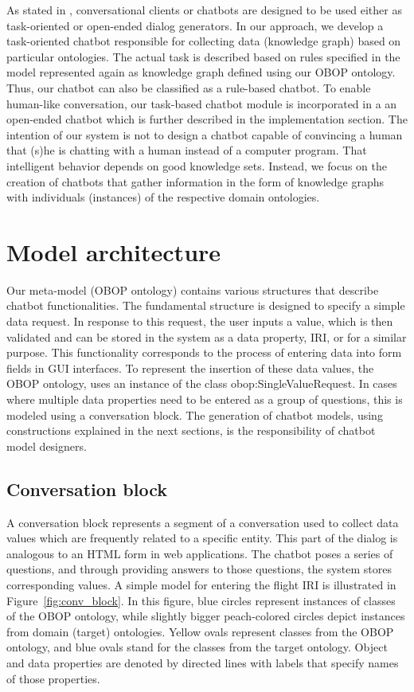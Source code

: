 \documentclass[runningheads]{llncs}
\begin{document}
As stated in \cite{agarwal2020review}, conversational clients or chatbots are designed to be used either as task-oriented or open-ended dialog generators. In our approach, we develop a task-oriented chatbot responsible for collecting data (knowledge graph) based on particular ontologies. The actual task is described based on rules specified in the model represented again as knowledge graph defined using our OBOP ontology. Thus, our chatbot can also be classified as a rule-based chatbot. To enable human-like conversation, our task-based chatbot module is incorporated in a an open-ended chatbot which is further described in the implementation section. The intention of our system is not to design a chatbot capable of convincing a human that (s)he is chatting with a human instead of a computer program. That intelligent behavior depends on good knowledge sets. Instead, we focus on the creation of chatbots that gather information in the form of knowledge graphs with individuals (instances) of the respective domain ontologies.  



\section{Model architecture}
Our meta-model (OBOP ontology) contains various structures that describe chatbot functionalities. The fundamental structure is designed to specify a simple data request. In response to this request, the user inputs a value, which is then validated and can be stored in the system as a data property, IRI, or for a similar purpose. This functionality corresponds to the process of entering data into form fields in GUI interfaces. To represent the insertion of these data values, the OBOP ontology, uses an instance of the class obop:SingleValueRequest. In cases where multiple data properties need to be entered as a group of questions, this is modeled using a conversation block. The generation of chatbot models, using constructions explained in the next sections, is the responsibility of chatbot model designers.  

\subsection{Conversation block}
A conversation block represents a segment of a conversation used to collect data values which are frequently related to a specific entity. This part of the dialog is analogous to an HTML form in web applications. The chatbot poses a series of questions, and through providing answers to those questions, the system stores corresponding values. A simple model for entering the flight IRI is illustrated in Figure~\ref{fig:conv_block}. In this figure, blue circles represent instances of classes of the OBOP ontology, while slightly bigger peach-colored circles depict instances from domain (target) ontologies. Yellow ovals represent classes from the OBOP ontology, and blue ovals stand for the classes from the target ontology. Object and data properties are denoted by directed lines with labels that specify names of those properties.     
\end{document}
